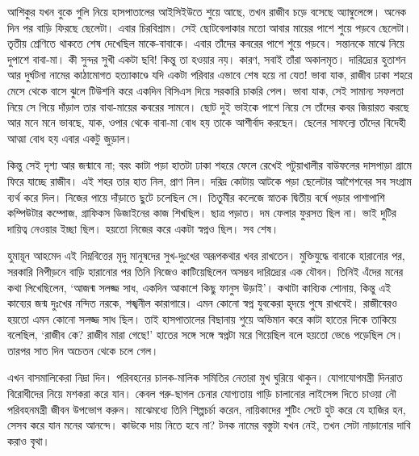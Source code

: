 \documentclass[a4paper,10 pt,addpoints]{article}
\begin{document}
\begin{center}
\fbox{\fbox{\parbox{5.5in}{\centering  }}}
\end{center}
আশিকুর যখন বুকে গুলি নিয়ে হাসপাতালের আইসিইউতে শুয়ে আছে, তখন রাজীব চড়ে বসেছে অ্যাম্বুলেন্সে। অনেক দিন পর বাড়ি ফিরছে ছেলেটা। এবার চিরবিশ্রাম। সেই ছোটবেলাকার মতো আবার মায়ের পাশে শুয়ে পড়বে ছেলেটা। তৃতীয় শ্রেণিতে থাকতে শেষ দেখেছিল মাকে-বাবাকে। এবার তাঁদের কবরের পাশে শুয়ে পড়বে। সন্তানকে মাঝে নিয়ে দুপাশে বাবা-মা। কী সুন্দর সুখী একটা ছবি! কিন্তু তা হওয়ার নয়। কারণ, সবাই তাঁরা অকালমৃত। দারিদ্র্যের হুতাশন আর দুর্ঘটনা নামের কাঠামোগত হত্যাকাণ্ডে যদি একটা পরিবার এভাবে শেষ হয়ে না যেত! ভাবা যাক, রাজীব ঢাকা শহরে মেসে থেকে বাসে ঝুলে টিউশনি করে একদিন বিসিএস দিয়ে সরকারি চাকরি পেল। ভাবা যাক, সেই সামান্য সফলতা নিয়ে সে গিয়ে দাঁড়াল তার বাবা-মায়ের কবরের সামনে। ছোট দুই ভাইকে পাশে নিয়ে সে তাঁদের কবর জিয়ারত করছে আর মনে মনে ভাবছে, যাক, ওপার থেকে বাবা-মা বোধ হয় তাকে আশীর্বাদ করছেন। ছেলের সাফল্যে তাঁদের বিদেহী আত্মা বোধ হয় এবার একটু জুড়াল।

কিন্তু সেই দৃশ্য আর জন্মাবে না; বরং কাটা পড়া হাতটা ঢাকা শহরে ফেলে রেখেই পটুয়াখালীর বাউফলের দাসপাড়া গ্রামে ফিরে যাচ্ছে রাজীব। এই শহর তার হাত নিল, প্রাণ নিল। দরিদ্র কোটায় আটকে পড়া ছেলেটার আশৈশবের সব সংগ্রাম ব্যর্থ করে দিল। নিজের পায়ে দাঁড়াতে ছুটে চলেছিল সে। তিতুমীর কলেজে স্নাতক দ্বিতীয় বর্ষে পড়ার পাশাপাশি কম্পিউটার কম্পোজ, গ্রাফিকস ডিজাইনের কাজ শিখছিল। ছাত্র পড়াত। দম ফেলার ফুরসত ছিল না। ভাই দুটির দায়িত্ব নেওয়ার ইচ্ছা ছিল। হয়তো নিজের করে একটা স্বপ্নও ছিল। সব শেষ।

হ‌ুমায়ূন আহমেদ এই নিম্নবিত্তের মৃদু মানুষদের সুখ-দুঃখের অরূপকথার খবর রাখতেন। মুক্তিযুদ্ধে বাবাকে হারানোর পর, সরকারি নিপীড়নে বাড়ি হারানোর পর তিনি নিজেও কাটিয়েছিলেন অসম্ভব দারিদ্র্যের এক যৌবন। তিনিই এঁদের মনের কথা লিখেছিলেন, ‘আজন্ম সলজ্জ সাধ, একদিন আকাশে কিছু ফানুস উড়াই’। কথাটা কাব্যিক শোনায়, কিন্তু এই কাব্যের জন্ম দুঃখের নন্দিত নরকে, শঙ্খনীল কারাগারে। এমন কোনো স্বপ্ন যুবকেরা হৃদয়ে পুষে রাখবেই। রাজীবেরও হয়তো এমন কোনো সলজ্জ সাধ ছিল। তাই হাসপাতালের বিছানায় শুয়ে অভিমান করে কাটা হাতের দিকে তাকিয়ে বলেছিল, ‘রাজীব কে? রাজীব মারা গেছে!’ হাতের সঙ্গে সঙ্গে স্বপ্নটা মরে গিয়েছিল বলে হয়তো ভেঙে পড়েছিল সে। তারপর সাত দিন অচেতন থেকে চলে গেল।

এখন বাসমালিকেরা নিদ্রা দিন। পরিবহনের চালক-মালিক সমিতির নেতারা মুখ ঘুরিয়ে থাকুন। যোগাযোগমন্ত্রী দিনরাত বিরোধীদের নিয়ে মশকরা করে যান। কেবল গরু-ছাগল চেনার যোগ্যতায় গাড়ি চালানোর লাইসেন্স দিতে চাওয়া নৌ পরিবহনমন্ত্রী জীবন উপভোগ করুন। মাঝেমধ্যে তিনি শিল্পচর্চা করেন, নায়িকাদের শুটিং সেটে হুট করে যে হাজির হন, সেসব করে যান মনের আনন্দে। কাউকে দায় নিতে হবে না? টনক নামের বস্তুটা যখন নেই, তখন সেটা নাড়ানোর দাবি করাও বৃথা।
\end{document}
